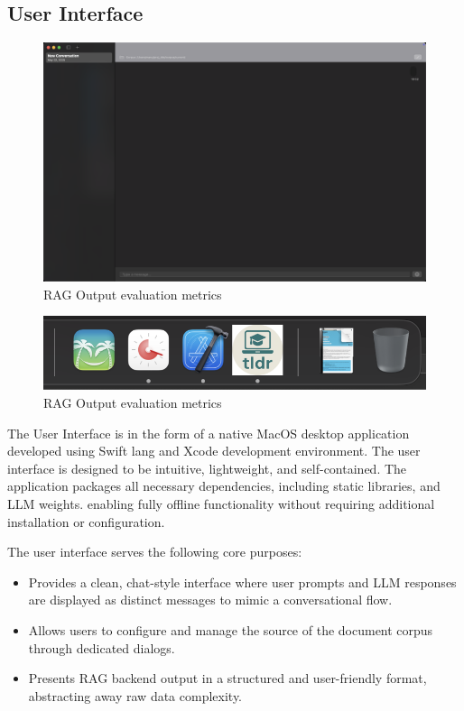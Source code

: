 \subsection{User Interface}
\label{subsec:AppDesignModules-UI}

\begin{figure}[h]
    \centering
    \includegraphics[width=1.0\linewidth]{images/tldr-ui-window.png}
    \caption{RAG Output evaluation metrics ~\cite{cardenas2023rag}}
    \label{fig:autoregressive_decoding}
\end{figure}

\begin{figure}[h]
    \centering
    \includegraphics[width=0.75\linewidth]{images/tldr-dock-icon.png}
    \caption{RAG Output evaluation metrics ~\cite{cardenas2023rag}}
    \label{fig:autoregressive_decoding}
\end{figure}


The User Interface is in the form of a native MacOS desktop application developed using Swift lang and Xcode development environment. The user interface is designed to be intuitive, lightweight, and self-contained. The application packages all necessary dependencies, including static libraries, and LLM weights. enabling fully offline functionality without requiring additional installation or configuration.

The user interface serves the following core purposes:

\begin{itemize}
    \item Provides a clean, chat-style interface where user prompts and LLM responses are displayed as distinct messages to mimic a conversational flow.
    \item Allows users to configure and manage the source of the document corpus through dedicated dialogs.
    \item Presents RAG backend output in a structured and user-friendly format, abstracting away raw data complexity.
\end{itemize}

